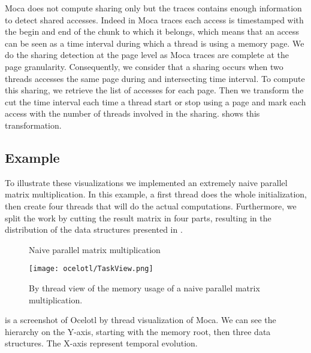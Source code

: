 \gls{Moca} does not compute sharing only but the traces contains enough information to detect shared accesses.
Indeed in \gls{Moca} traces each access is timestamped with the begin and end of the chunk to which it belongs, which means that an access can be seen as a time interval during which a thread is using a memory page.
We do the sharing detection at the page level as \gls{Moca} traces are complete at the page granularity.
Consequently, we consider that a sharing occurs when two threads accesses the same page during and intersecting time interval.
To compute this sharing, we retrieve the list of accesses for each page.
Then we transform the cut the time interval each time a thread start or stop using a page and mark each access with the number of threads involved in the sharing.
 shows this transformation.

\subsection{Example}

To illustrate these visualizations we implemented an extremely naive parallel matrix multiplication.
In this example, a first thread does the whole initialization, then create four threads that will do the actual computations.
Furthermore, we split the work by cutting the result matrix in four parts, resulting in the distribution of the data structures presented in .

\begin{figure}[htb]
    \centering
    
    \caption{Naive parallel matrix multiplication}
    \label{fig:mat-mult-par}
\end{figure}

\begin{figure}[htb]
    \centering
    \texttt{[image: ocelotl/TaskView.png]}
    \caption{By thread view of the memory usage of a naive parallel matrix multiplication.}
    \label{fig:ocelotl-th0}
\end{figure}

 is a screenshot of \gls{Ocelotl} by thread visualization of \gls{Moca}.
We can see the hierarchy on the Y-axis, starting with the memory root, then three data structures.
The X-axis represent temporal evolution.

